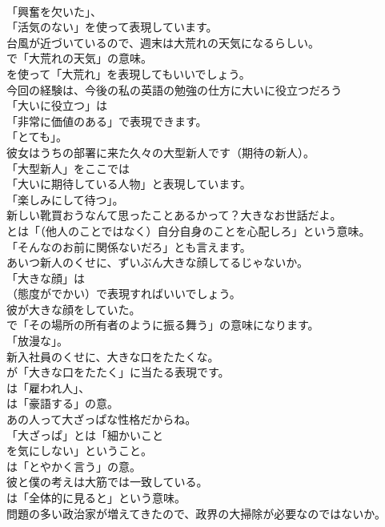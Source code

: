 \documentclass[8pt]{extreport}
\begin{document}
\begin{CJK}{UTF8}{min}
\\	「興奮を欠いた」、
\\	「活気のない」を使って表現しています。	
\\	台風が近づいているので、週末は大荒れの天気になるらしい。 
\\	で「大荒れの天気」の意味。
\\	を使って「大荒れ」を表現してもいいでしょう。	
\\	今回の経験は、今後の私の英語の勉強の仕方に大いに役立つだろう 
\\	「大いに役立つ」は
\\	「非常に価値のある」で表現できます。
\\	「とても」。	
\\	彼女はうちの部署に来た久々の大型新人です（期待の新人）。 
\\	「大型新人」をここでは
\\	「大いに期待している人物」と表現しています。
\\	「楽しみにして待つ」。	
\\	新しい靴買おうなんて思ったことあるかって？大きなお世話だよ。 
\\	とは「（他人のことではなく）自分自身のことを心配しろ」という意味。
\\	「そんなのお前に関係ないだろ」とも言えます。	
\\	あいつ新人のくせに、ずいぶん大きな顔してるじゃないか。 
\\	「大きな顔」は
\\	（態度がでかい）で表現すればいいでしょう。	
\\	彼が大きな顔をしていた。 
\\	で「その場所の所有者のように振る舞う」の意味になります。
\\	「放漫な」。	
\\	新入社員のくせに、大きな口をたたくな。 
\\	が「大きな口をたたく」に当たる表現です。
\\	は「雇われ人」、
\\	は「豪語する」の意。	
\\	あの人って大ざっぱな性格だからね。 
\\	「大ざっぱ」とは「細かいこと
\\	を気にしない」ということ。
\\	は「とやかく言う」の意。	
\\	彼と僕の考えは大筋では一致している。 
\\	は「全体的に見ると」という意味。	
\\	問題の多い政治家が増えてきたので、政界の大掃除が必要なのではないか。 

\end{CJK}
\end{document}
